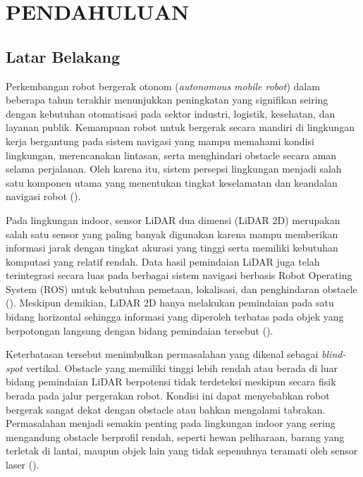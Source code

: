 \chapter{PENDAHULUAN}
\label{chap:pendahuluan}

\section{Latar Belakang}
\label{sec:latarbelakang}

Perkembangan robot bergerak otonom (\textit{autonomous mobile robot}) dalam beberapa tahun terakhir menunjukkan peningkatan yang signifikan seiring dengan kebutuhan otomatisasi pada sektor industri, logistik, kesehatan, dan layanan publik. Kemampuan robot untuk bergerak secara mandiri di lingkungan kerja bergantung pada sistem navigasi yang mampu memahami kondisi lingkungan, merencanakan lintasan, serta menghindari obstacle secara aman selama perjalanan. Oleh karena itu, sistem persepsi lingkungan menjadi salah satu komponen utama yang menentukan tingkat keselamatan dan keandalan navigasi robot (\cite{Liu2024,Macenski2022}).

Pada lingkungan indoor, sensor LiDAR dua dimensi (LiDAR 2D) merupakan salah satu sensor yang paling banyak digunakan karena mampu memberikan informasi jarak dengan ting\-kat akurasi yang tinggi serta memiliki kebutuhan komputasi yang relatif rendah. Data hasil pemindaian LiDAR juga telah terintegrasi secara luas pada berbagai sistem navigasi berbasis Robot Operating System (ROS) untuk kebutuhan pemetaan, lokalisasi, dan penghindaran obstacle (\cite{Macenski2022}). Meskipun demikian, LiDAR 2D hanya melakukan pemindaian pada satu bidang horizontal sehingga informasi yang diperoleh terbatas pada objek yang berpotongan langsung dengan bidang pemindaian tersebut (\cite{Fagundes2024}).

Keterbatasan tersebut menimbulkan permasalahan yang dikenal sebagai \textit{blind-spot} vertikal. Obstacle yang memiliki tinggi lebih rendah atau berada di luar bidang pemindaian LiDAR berpotensi tidak terdeteksi meskipun secara fisik berada pada jalur pergerakan robot. Kondisi ini dapat menyebabkan robot bergerak sangat dekat dengan obstacle atau bahkan mengalami tabrakan. Permasalahan menjadi semakin penting pada lingkungan indoor yang sering mengandung obstacle berprofil rendah, seperti hewan peliharaan, barang yang terletak di lantai, maupun objek lain yang tidak sepenuhnya teramati oleh sensor laser (\cite{Kibii2022,Fagundes2024}).

